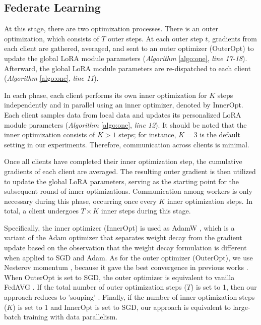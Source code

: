 \documentclass[sigconf]{acmart}
\begin{document}
\subsection{Federate Learning}
At this stage, there are two optimization processes. There is an outer optimization, which consists of $T$ outer steps. At each outer step $t$, gradients from each client are gathered, averaged, and sent to an outer optimizer (OuterOpt) to update the global LoRA module parameters (\textit{Algorithm} \ref{algo:one}, \textit{line 17-18}). Afterward, the global LoRA module parameters are re-dispatched to each client (\textit{Algorithm} \ref{algo:one}, \textit{line 11}).
\par
In each phase, each client performs its own inner optimization for $K$ steps independently and in parallel using an inner optimizer, denoted by InnerOpt. Each client samples data from local data and updates its personalized LoRA module parameters (\textit{Algorithm} \ref{algo:one}, \textit{line 12}). It should be noted that the inner optimization consists of $K > 1$ steps; for instance, $K=3$ is the default setting in our experiments. Therefore, communication across clients is minimal.
\par
Once all clients have completed their inner optimization step, the cumulative gradients of each client are averaged. The resulting outer gradient is then utilized to update the global LoRA parameters, serving as the starting point for the subsequent round of inner optimizations. Communication among workers is only necessary during this phase, occurring once every $K$ inner optimization steps. In total, a client undergoes $T \times K$ inner steps during this stage.
\par
Specifically, the inner optimizer (InnerOpt) is used as AdamW \cite{zhuang2022understanding}, which is a variant of the Adam optimizer that separates weight decay from the gradient update based on the observation that the weight decay formulation is different when applied to SGD and Adam. As for the outer optimizer (OuterOpt), we use Nesterov momentum \cite{sutskever2013importance}, because it gave the best convergence in previous works \cite{douillard2023diloco}. When OuterOpt is set to SGD, the outer optimizer is equivalent to vanilla FedAVG \cite{mcmahan2017communication}. If the total number of outer optimization steps ($T$) is set to 1, then our approach reduces to 'souping' \cite{wortsman2021learning}. Finally, if the number of inner optimization steps ($K$) is set to 1 and InnerOpt is set to SGD, our approach is equivalent to large-batch training with data parallelism.
\end{document}
